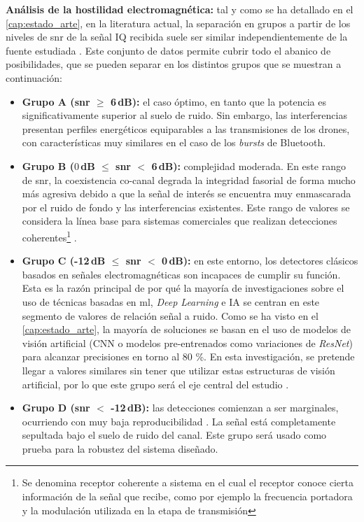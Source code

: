 \textbf{Análisis de la hostilidad electromagnética:} tal y como se ha detallado en el \ref{cap:estado_arte}, en la literatura actual, la separación en grupos a partir de los niveles de \gls{snr} de la señal IQ recibida suele ser similar independientemente de la fuente estudiada \cite{zheng_uavsignal_2025, gluge_robust_2024, vasant_ahirrao_rf-based_2024}. Este conjunto de datos permite cubrir todo el abanico de posibilidades, que se pueden separar en los distintos grupos que se muestran a continuación:
\begin{itemize}
    \item \textbf{Grupo A (\gls{snr} $\ge$ 6\,dB):} el caso óptimo, en tanto que la potencia es significativamente superior al suelo de ruido. Sin embargo, las interferencias presentan perfiles energéticos equiparables a las transmisiones de los drones, con características muy similares en el caso de los \textit{bursts} de Bluetooth.
    \item \textbf{Grupo B ($0$\,dB $\le$ \gls{snr} $<$ 6\,dB):} complejidad moderada. En este rango de \gls{snr}, la coexistencia co-canal degrada la integridad fasorial de forma mucho más agresiva debido a que la señal de interés se encuentra muy enmascarada por el ruido de fondo y las interferencias existentes. Este rango de valores se considera la línea base para sistemas comerciales que realizan detecciones coherentes\footnote{Se denomina receptor coherente a sistema en el cual el receptor conoce cierta información de la señal que recibe, como por ejemplo la frecuencia portadora y la modulación utilizada en la etapa de transmisión} \cite{vasant_ahirrao_rf-based_2024, martelli_exploitation_2020}.
    \item \textbf{Grupo C (-12\,dB $\le$ \gls{snr} $<$ 0\,dB):} en este entorno, los detectores clásicos basados en señales electromagnéticas son incapaces de cumplir su función. Esta es la razón principal de por qué la mayoría de investigaciones sobre el uso de técnicas basadas en \gls{ml}, \textit{Deep Learning} e IA se centran en este segmento de valores de relación señal a ruido. Como se ha visto en el \ref{cap:estado_arte}, la mayoría de soluciones se basan en el uso de modelos de visión artificial (CNN o modelos pre-entrenados como  variaciones de \textit{ResNet}) para alcanzar precisiones en torno al 80 \%. En esta investigación, se pretende llegar a valores similares sin tener que utilizar estas estructuras de visión artificial, por lo que este grupo será el eje central del estudio \cite{gluge_robust_2024}.
    \item \textbf{Grupo D (\gls{snr} $<$ -12\,dB):} las detecciones comienzan a ser marginales, ocurriendo con muy baja reproducibilidad \cite{gluge_robust_2024}. La señal está completamente sepultada bajo el suelo de ruido del canal. Este grupo será usado como prueba para la robustez del sistema diseñado. 
\end{itemize}

